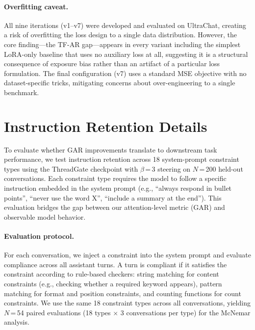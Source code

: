 \paragraph{Overfitting caveat.} All nine iterations (v1--v7) were developed and evaluated on UltraChat, creating a risk of overfitting the loss design to a single data distribution. However, the core finding---the TF-AR gap---appears in every variant including the simplest LoRA-only baseline that uses no auxiliary loss at all, suggesting it is a structural consequence of exposure bias rather than an artifact of a particular loss formulation. The final configuration (v7) uses a standard MSE objective with no dataset-specific tricks, mitigating concerns about over-engineering to a single benchmark.

\section{Instruction Retention Details}\label{sec:appendix-ir}

To evaluate whether GAR improvements translate to downstream task performance, we test instruction retention across 18 system-prompt constraint types using the ThreadGate checkpoint with $\beta$\,=\,3 steering on $N$\,=\,200 held-out conversations. Each constraint type requires the model to follow a specific instruction embedded in the system prompt (e.g., ``always respond in bullet points'', ``never use the word X'', ``include a summary at the end''). This evaluation bridges the gap between our attention-level metric (GAR) and observable model behavior.

\paragraph{Evaluation protocol.} For each conversation, we inject a constraint into the system prompt and evaluate compliance across all assistant turns. A turn is compliant if it satisfies the constraint according to rule-based checkers: string matching for content constraints (e.g., checking whether a required keyword appears), pattern matching for format and position constraints, and counting functions for count constraints. We use the same 18 constraint types across all conversations, yielding $N$\,=\,54 paired evaluations (18 types $\times$ 3 conversations per type) for the McNemar analysis.

